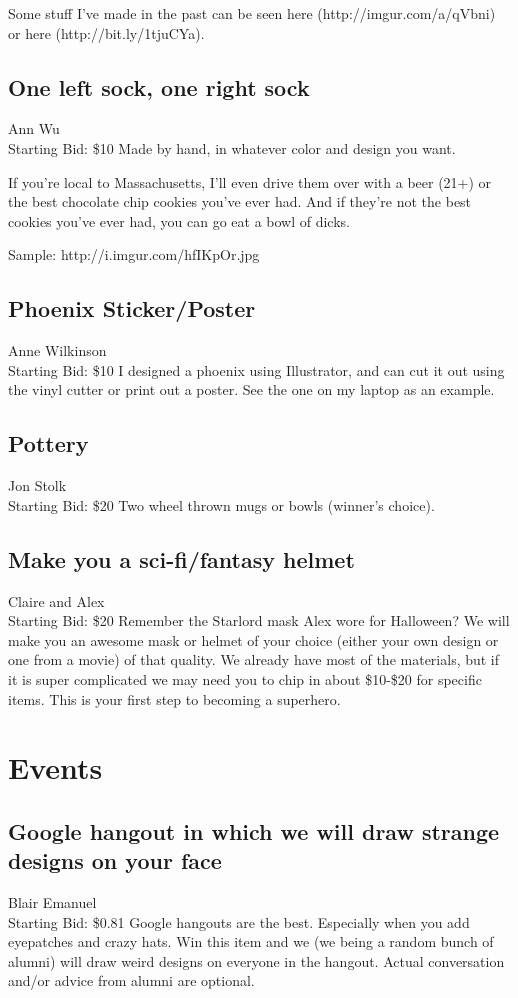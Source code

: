 \documentclass[11pt]{article}
\begin{document}
Some stuff I've made in the past can be seen here (http://imgur.com/a/qVbni) or here (http://bit.ly/1tjuCYa).
\subsection{One left sock, one right sock}
Ann Wu
\\
Starting Bid: \$10
\newline
Made by hand, in whatever color and design you want.

If you're local to Massachusetts, I'll even drive them over with a beer (21+) or the best chocolate chip cookies you've ever had. And if they're not the best cookies you've ever had, you can go eat a bowl of dicks.

Sample:
http://i.imgur.com/hfIKpOr.jpg
\subsection{Phoenix Sticker/Poster}
Anne Wilkinson
\\
Starting Bid: \$10
\newline
I designed a phoenix using Illustrator, and can cut it out using the vinyl cutter or print out a poster. See the one on my laptop as an example.
\subsection{Pottery}
Jon Stolk
\\
Starting Bid: \$20
\newline
Two wheel thrown mugs or bowls (winner's choice).
\subsection{Make you a sci-fi/fantasy helmet}
Claire and Alex
\\
Starting Bid: \$20
\newline
Remember the Starlord mask Alex wore for Halloween?
We will make you an awesome mask or helmet of your choice (either your own design or one from a movie) of that quality. 
We already have most of the materials, but if it is super complicated we may need you to chip in about \$10-\$20 for specific items.
This is your first step to becoming a superhero.
\section{Events}
\subsection{Google hangout in which we will draw strange designs on your face}
Blair Emanuel
\\
Starting Bid: \$0.81
\newline
Google hangouts are the best. Especially when you add eyepatches and crazy hats. Win this item and we (we being a random bunch of alumni) will draw weird designs on everyone in the hangout. Actual conversation and/or advice from alumni are optional.
\end{document}
